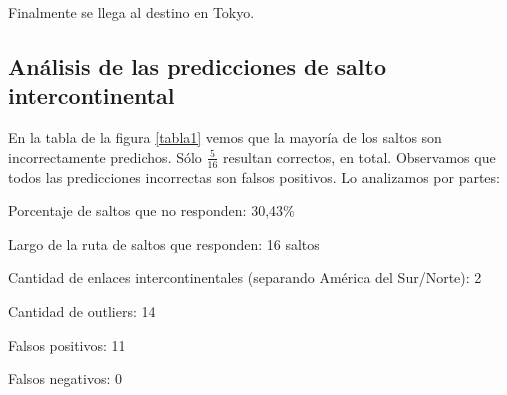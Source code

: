 Finalmente se llega al destino en Tokyo.

\subsection{Análisis de las predicciones de salto intercontinental}

En la tabla de la figura \ref{tabla1} vemos que la mayoría de los saltos son incorrectamente predichos. Sólo $\frac{5}{16}$ resultan correctos, en total. Observamos que todos las predicciones incorrectas son falsos positivos. Lo analizamos por partes:

Porcentaje de saltos que no responden: 30,43\%

Largo de la ruta de saltos que responden: 16 saltos 

Cantidad de enlaces intercontinentales (separando América del Sur/Norte): 2

Cantidad de outliers: 14

Falsos positivos: 11

Falsos negativos: 0


